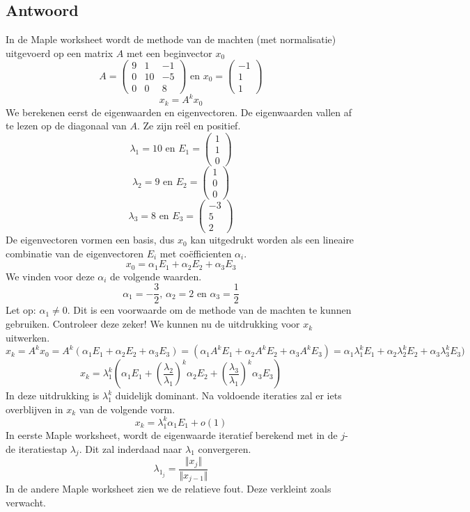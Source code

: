\documentclass[examenvragen.tex]{subfiles}
\begin{document}
\subsection{Antwoord}
In de Maple worksheet wordt de methode van de machten (met normalisatie) uitgevoerd op een matrix $A$ met een beginvector $x_0$
\[
A=
\begin{pmatrix}
9 & 1 & -1\\
0 & 10 & -5\\
0 & 0 & 8
\end{pmatrix}
\text{ en }
x_0 = \begin{pmatrix}
-1\\1\\1
\end{pmatrix}
\]
\[
x_{k} = A^{k}x_{0} 
\]
We berekenen eerst de eigenwaarden en eigenvectoren. De eigenwaarden vallen af te lezen op de diagonaal van $A$. Ze zijn re\"el en positief.
\[
\lambda_{1} = 10 \text{ en } E_{1} = \begin{pmatrix}1\\1\\0\end{pmatrix} 
\]
\[
\lambda_{2} = 9 \text{ en } E_{2} = \begin{pmatrix}1\\0\\0\end{pmatrix} 
\]
\[
\lambda_{3} = 8 \text{ en } E_{3} = \begin{pmatrix}-3\\5\\2\end{pmatrix} 
\]
De eigenvectoren vormen een basis, dus $x_0$ kan uitgedrukt worden als een lineaire combinatie van de eigenvectoren $E_i$ met co\"efficienten $\alpha_i$.
\[
x_{0} = \alpha_{1}E_1 + \alpha_2E_2 + \alpha_{3}E_3
\]
We vinden voor deze $\alpha_i$ de volgende waarden.
\[
\alpha_1 = -\frac{3}{2} \text{, } \alpha_{2} = 2 \text{ en } \alpha_{3} = \frac{1}{2}
\]
Let op: $\alpha_1 \neq 0$. Dit is een voorwaarde om de methode van de machten te kunnen gebruiken. Controleer deze zeker!
We kunnen nu de uitdrukking voor $x_{k}$ uitwerken.
\[
x_{k} = A^{k}x_{0} = A^{k}(\alpha_{1}E_1 + \alpha_2E_2 + \alpha_{3}E_3) = (\alpha_{1}A^{k}E_1 + \alpha_2A^{k}E_2 + \alpha_{3}A^{k}E_3)
= \alpha_{1}\lambda_1^{k}E_1 + \alpha_2\lambda_2^{k}E_2 + \alpha_{3}\lambda_3^{k}E_3)
\]
\[
x_{k} = \lambda_{1}^{k}\left(\alpha_1E_1 + \left(\frac{\lambda_2}{\lambda_1}\right)^{k}\alpha_2E_2 + \left(\frac{\lambda_3}{\lambda_1}\right)^{k}\alpha_3E_3\right)
\]
In deze uitdrukking is $\lambda_{1}^{k}$ duidelijk dominant. Na voldoende iteraties zal er iets overblijven in $x_k$ van de volgende vorm.
\[
x_{k} = \lambda_{1}^{k}\alpha_1E_1 + o(1)
\]
In eerste Maple worksheet, wordt de eigenwaarde iteratief berekend met in de $j$-de iteratiestap $\lambda_{j}$. Dit zal inderdaad naar $\lambda_{1}$ convergeren.
\[
\lambda_{1_{j}} = \frac{\Vert x_{j}\Vert }{\Vert x_{j-1}\Vert}
\]
In de andere Maple worksheet zien we de relatieve fout. Deze verkleint zoals verwacht.
\end{document}
